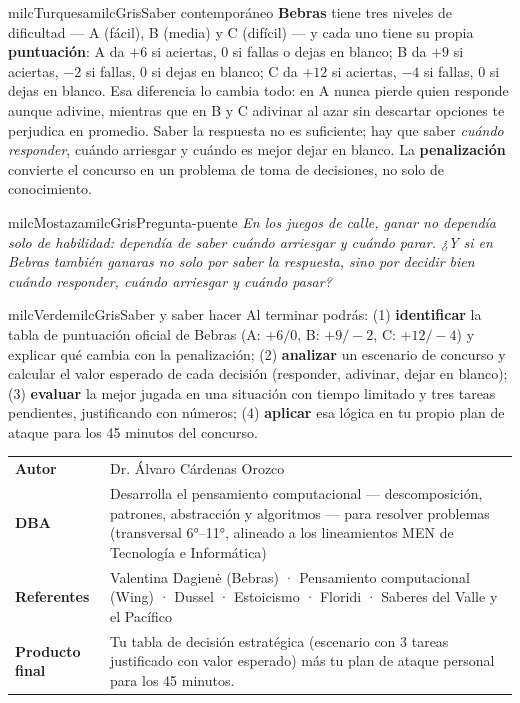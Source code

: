\documentclass[11pt,letterpaper]{article}
\begin{document}
\begin{softbox}{milcTurquesa}{milcGris}{Saber contemporáneo}
\textbf{Bebras} tiene tres niveles de dificultad --- A (fácil), B (media) y C (difícil) --- y cada uno tiene su propia \textbf{puntuación}: A da $+6$ si aciertas, $0$ si fallas o dejas en blanco; B da $+9$ si aciertas, $-2$ si fallas, $0$ si dejas en blanco; C da $+12$ si aciertas, $-4$ si fallas, $0$ si dejas en blanco. Esa diferencia lo cambia todo: en A nunca pierde quien responde aunque adivine, mientras que en B y C adivinar al azar sin descartar opciones te perjudica en promedio. Saber la respuesta no es suficiente; hay que saber \emph{cuándo responder}, cuándo arriesgar y cuándo es mejor dejar en blanco. La \textbf{penalización} convierte el concurso en un problema de toma de decisiones, no solo de conocimiento.
\end{softbox}

\begin{softbox}{milcMostaza}{milcGris}{Pregunta-puente}
\textit{En los juegos de calle, ganar no dependía solo de habilidad: dependía de saber cuándo arriesgar y cuándo parar. ¿Y si en Bebras también ganaras no solo por saber la respuesta, sino por decidir bien cuándo responder, cuándo arriesgar y cuándo pasar?}
\end{softbox}

\begin{softbox}{milcVerde}{milcGris}{Saber y saber hacer}
Al terminar podrás: (1) \textbf{identificar} la tabla de puntuación oficial de Bebras (A: $+6/0$, B: $+9/-2$, C: $+12/-4$) y explicar qué cambia con la penalización; (2) \textbf{analizar} un escenario de concurso y calcular el valor esperado de cada decisión (responder, adivinar, dejar en blanco); (3) \textbf{evaluar} la mejor jugada en una situación con tiempo limitado y tres tareas pendientes, justificando con números; (4) \textbf{aplicar} esa lógica en tu propio plan de ataque para los 45 minutos del concurso.
\end{softbox}



\small
\begin{tabularx}{\textwidth}{>{\bfseries}p{3.0cm}Y}
Autor & Dr. Álvaro Cárdenas Orozco\\
DBA & Desarrolla el pensamiento computacional --- descomposición, patrones, abstracción y algoritmos --- para resolver problemas (transversal 6°--11°, alineado a los lineamientos MEN de Tecnología e Informática)\\
Referentes & Valentina Dagienė (Bebras) · Pensamiento computacional (Wing) · Dussel · Estoicismo · Floridi · Saberes del Valle y el Pacífico\\
Producto final & Tu tabla de decisión estratégica (escenario con 3 tareas justificado con valor esperado) más tu plan de ataque personal para los 45 minutos.\\
\end{tabularx}
\normalsize
\end{document}
